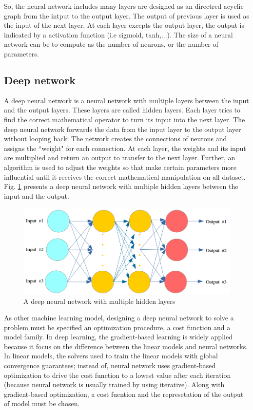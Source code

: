 So, the neural network includes many layers are designed as an directred acyclic graph from the intput to the output layer. The output of previous layer is used as the input of the next layer. At each layer excepts the output layer, the output is indicated by a activation function (i.e sigmoid, tanh,...). The size of a neural network can be to compute as the number of neurons, or the number of parameters.

\subsection{Deep network}

A deep neural network is a neural network with multiple layers between the input and the output layers. These layers are called hidden layers. Each layer tries to find the correct mathematical operator to turn its input into the next layer. The deep neural network forwards the data from the input layer to the output layer without looping back: The network creates the connections of neurons and assigns the ``weight" for each connection. At each layer, the weights and its input are multiplied and return an output to transfer to the next layer. Further, an algorithm is used to adjust the weights so that make certain parameters more influential until it receives the correct mathematical manipulation on all dataset. Fig. \ref{figndeepnetworks} presents a deep neural network with multiple hidden layers between the input and the output.

\begin{figure}[h]
	\centering
	\includegraphics[scale=0.5]{images/deep_neural_network}
	\caption{A deep neural network with multiple hidden layers}
	\label{figndeepnetworks}
\end{figure}

As other machine learning model, designing a deep neural network to solve a problem must be specified an optimization procedure, a cost function and a model family. In deep learning, the gradient-based learning is widely applied because it focus on the difference between the linear models and neural networks. In linear models, the solvers used to train the linear models with global convergence guarantees; instead of, neural network uses gradient-based optimization to drive the cost function to a lowest value after each iteration (because neural network is usually trained by using iterative). Along with gradient-based optimization, a cost fucntion and the represetation of the output of model must be chosen.

